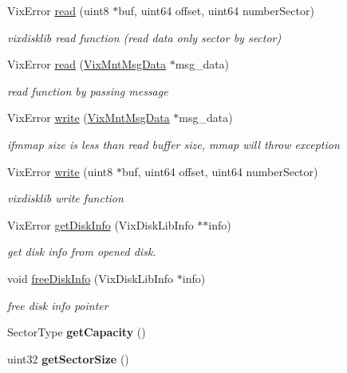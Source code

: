 \begin{DoxyCompactItemize}
Vix\+Error \hyperlink{class_vix_mnt_disk_handle_a58eb682826a8be39431c258aa531a00c}{read} (uint8 $\ast$buf, uint64 offset, uint64 number\+Sector)
\begin{DoxyCompactList}\small\item\em vixdisklib read function (read data only sector by sector) \end{DoxyCompactList}\item 
Vix\+Error \hyperlink{class_vix_mnt_disk_handle_a2f601858b3a6dc381d70bf56bec0771c}{read} (\hyperlink{class_vix_mnt_msg_data}{Vix\+Mnt\+Msg\+Data} $\ast$msg\+\_\+data)
\begin{DoxyCompactList}\small\item\em read function by passing message \end{DoxyCompactList}\item 
Vix\+Error \hyperlink{class_vix_mnt_disk_handle_a85573095a247d911f2f565bff91d5709}{write} (\hyperlink{class_vix_mnt_msg_data}{Vix\+Mnt\+Msg\+Data} $\ast$msg\+\_\+data)
\begin{DoxyCompactList}\small\item\em ifmmap size is less than read buffer size, mmap will throw exception \end{DoxyCompactList}\item 
Vix\+Error \hyperlink{class_vix_mnt_disk_handle_ab6552b9226705bdffb0d4ee7d3ab4e29}{write} (uint8 $\ast$buf, uint64 offset, uint64 number\+Sector)
\begin{DoxyCompactList}\small\item\em vixdisklib write function \end{DoxyCompactList}\item 
Vix\+Error \hyperlink{class_vix_mnt_disk_handle_a22ad3792bc17dc02ecfe73a9af595e12}{get\+Disk\+Info} (Vix\+Disk\+Lib\+Info $\ast$$\ast$info)
\begin{DoxyCompactList}\small\item\em get disk info from opened disk. \end{DoxyCompactList}\item 
void \hyperlink{class_vix_mnt_disk_handle_a798c98664a2978ff46b8224a5a2431d5}{free\+Disk\+Info} (Vix\+Disk\+Lib\+Info $\ast$info)
\begin{DoxyCompactList}\small\item\em free disk info pointer \end{DoxyCompactList}\item 
\hypertarget{class_vix_mnt_disk_handle_a59fafae47f7971a4378eeab47ad1bab4}{}\label{class_vix_mnt_disk_handle_a59fafae47f7971a4378eeab47ad1bab4} 
Sector\+Type {\bfseries get\+Capacity} ()
\item 
\hypertarget{class_vix_mnt_disk_handle_a6262117c52d45b8e4336cdf1725f08d2}{}\label{class_vix_mnt_disk_handle_a6262117c52d45b8e4336cdf1725f08d2} 
uint32 {\bfseries get\+Sector\+Size} ()
\end{DoxyCompactItemize}
